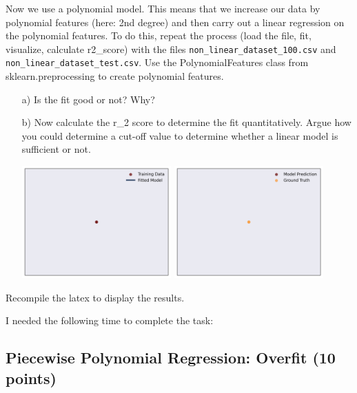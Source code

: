 Now we use a polynomial model. This means that we increase our data by polynomial features (here: 2nd degree) and then carry out a linear regression on the
polynomial features. To do this, repeat the process (load the file, fit, visualize, calculate r2\_score) with the files \texttt{non\_linear\_dataset\_100.csv} and \texttt{non\_linear\_dataset\_test.csv}.
Use the PolynomialFeatures class from sklearn.preprocessing to create polynomial features. 

\begin{enumerate}

\item[a)] Is the fit good or not? Why? 

\item[b)] Now calculate the r\_2 score to determine the fit quantitatively. Argue how you could determine a cut-off value to determine whether a linear model is sufficient or not.

\includegraphics[width=0.45\textwidth]{source_code/goodfit_polynomial_model.png}
\includegraphics[width=0.45\textwidth]{source_code/goodfit_polynomial_testdata.png}

\end{enumerate}

Recompile the latex to display the results.

I needed the following time to complete the task:

\subsection{Piecewise Polynomial Regression: Overfit (10 points)}

